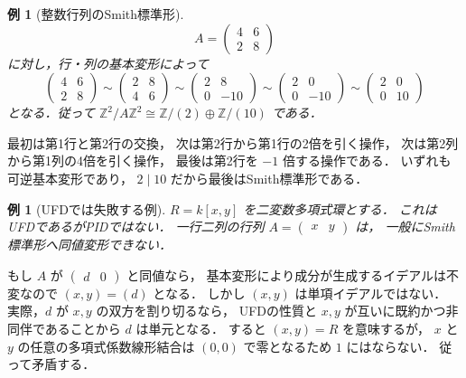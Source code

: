 \documentclass[a5paper,10pt,onecolumn]{jsarticle}
\makeatletter
\theoremstyle{mathnotetheorem}
\newtheorem{example}[theorem]{例}
\renewcommand{\proofname}{証明}
\renewenvironment{proof}[1][\proofname]{%
  \par\pushQED{\qed}\normalfont\topsep4\p@\@plus2\p@\relax
  \trivlist\item[\hskip\labelsep\bfseries #1]\ignorespaces
}{\popQED\endtrivlist\@endpefalse}
\makeatother
\begin{document}
\begin{example}[整数行列のSmith標準形]
\[
 A=\begin{pmatrix}4&6\\2&8\end{pmatrix}
\]
に対し，行・列の基本変形によって
\[
 \begin{pmatrix}4&6\\2&8\end{pmatrix}
 \sim\begin{pmatrix}2&8\\4&6\end{pmatrix}
 \sim\begin{pmatrix}2&8\\0&-10\end{pmatrix}
 \sim\begin{pmatrix}2&0\\0&-10\end{pmatrix}
 \sim\begin{pmatrix}2&0\\0&10\end{pmatrix}
\]
となる．従って
$\mathbb Z^2/A\mathbb Z^2
\cong\mathbb Z/(2)\oplus\mathbb Z/(10)$ である．
\end{example}
\begin{proof}
最初は第1行と第2行の交換，
次は第2行から第1行の2倍を引く操作，
次は第2列から第1列の4倍を引く操作，
最後は第2行を $-1$ 倍する操作である．
いずれも可逆基本変形であり，
$2\mid10$ だから最後はSmith標準形である．
\end{proof}

\begin{example}[UFDでは失敗する例]
$R=k[x,y]$ を二変数多項式環とする．
これはUFDであるがPIDではない．
一行二列の行列
$A=\begin{pmatrix}x&y\end{pmatrix}$ は，
一般にSmith標準形へ同値変形できない．
\end{example}
\begin{proof}
もし $A$ が
$\begin{pmatrix}d&0\end{pmatrix}$ と同値なら，
基本変形により成分が生成するイデアルは不変なので
$(x,y)=(d)$ となる．
しかし $(x,y)$ は単項イデアルではない．
実際，$d$ が $x,y$ の双方を割り切るなら，
UFDの性質と $x,y$ が互いに既約かつ非同伴であることから
$d$ は単元となる．
すると $(x,y)=R$ を意味するが，
$x$ と $y$ の任意の多項式係数線形結合は
$(0,0)$ で零となるため $1$ にはならない．
従って矛盾する．
\end{proof}
\end{document}
